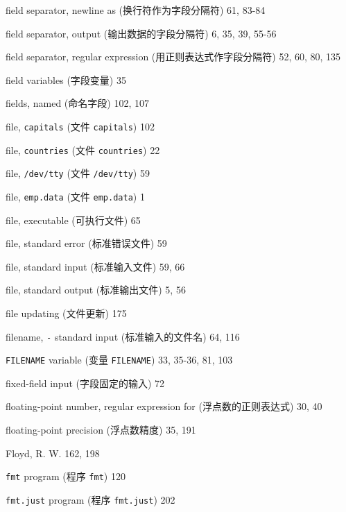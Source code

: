 \begin{multicols}{3}
\hangindent=3pc  field separator, newline as
(换行符作为字段分隔符) 61, 83-84

\hangindent=3pc  field separator, output (输出数据的字段分隔符)
6, 35, 39, 55-56

\hangindent=3pc  field separator, regular expression
(用正则表达式作字段分隔符) 52, 60, 80, 135

\hangindent=3pc  field variables (字段变量) 35

\hangindent=3pc  fields, named (命名字段) 102, 107

\hangindent=3pc  file, \verb'capitals' (文件 \verb'capitals') 102

\hangindent=3pc  file, \verb'countries' (文件 \verb'countries') 22

\hangindent=3pc  file, \verb'/dev/tty' (文件 \verb'/dev/tty') 59

\hangindent=3pc  file, \verb'emp.data' (文件 \verb'emp.data') 1

\hangindent=3pc  file, executable (可执行文件) 65

\hangindent=3pc  file, standard error (标准错误文件) 59

\hangindent=3pc  file, standard input (标准输入文件) 59, 66

\hangindent=3pc  file, standard output (标准输出文件) 5, 56

\hangindent=3pc  file updating (文件更新) 175

\hangindent=3pc  filename, \verb'-' standard input
(标准输入的文件名) 64, 116

\hangindent=3pc  \verb'FILENAME' variable (变量
\verb'FILENAME') 33, 35-36, 81, 103

\hangindent=3pc  fixed-field input (字段固定的输入) 72

\hangindent=3pc  floating-point number, regular expression for
(浮点数的正则表达式) 30, 40

\hangindent=3pc  floating-point precision (浮点数精度) 35, 191

\hangindent=3pc  Floyd, R. W. 162, 198

\hangindent=3pc  \verb'fmt' program (程序 \verb'fmt') 120

\hangindent=3pc  \verb'fmt.just' program (程序 \verb'fmt.just') 202


\end{multicols}

